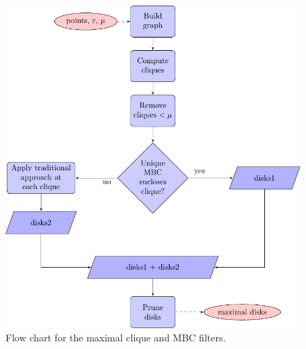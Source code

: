 \begin{itemize}
\begin{figure}
    \centering
    \includegraphics[width=\linewidth]{figures/CMBC_flowchart}
    \caption{Flow chart for the maximal clique and MBC filters.}\label{fig:CMBC_flowchart}
\end{figure}

\end{itemize}
